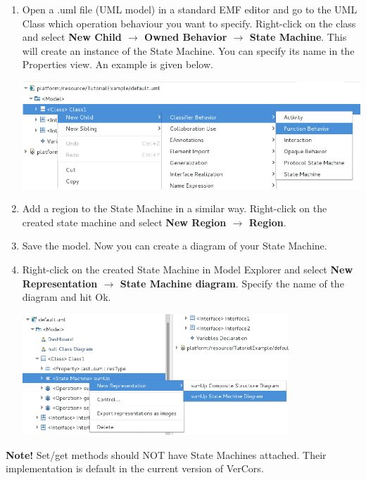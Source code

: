 \documentclass[12pt]{article}
\begin{document}
\begin{enumerate}
\item
Open a .uml file (UML model) in a standard EMF editor and go to the UML Class which operation behaviour you want to specify. Right-click on the class and select \textbf{New Child $\rightarrow$ Owned Behavior $\rightarrow$ State Machine}. This will create an instance of the State Machine. You can specify its name in the Properties view. An example is given below.

     \centerline{
     \includegraphics[width=14cm]{draws/sm-creation.png}
     \label{fig:vce-proj}
     }

\item 
Add a region to the State Machine in a similar way. Right-click on the created state machine and select \textbf{New Region $\rightarrow$ Region}.
\item
Save the model. Now you can create a diagram of your State Machine.
\item
Right-click on the created State Machine in Model Explorer and select \textbf{New Representation $\rightarrow$ State Machine diagram}. Specify the name of the diagram and hit Ok.

     \centerline{
     \includegraphics[width=10cm]{draws/sm-diagr.png}
     \label{fig:vce-proj}
     }
\end{enumerate}

\textbf{Note! }Set/get methods should NOT have State Machines attached. Their implementation is default in the current version of VerCors.
\end{document}
